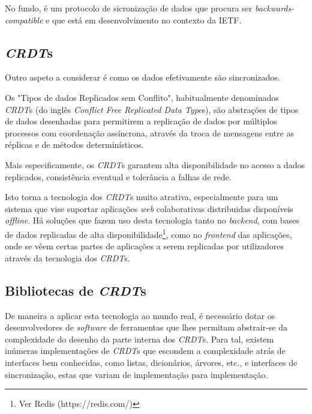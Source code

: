 \documentclass[runningheads]{llncs}
\begin{document}
        No fundo, é um protocolo de sicronização de dados que procura ser
        {\itshape backwards-compatible} e que está em desenvolvimento no
        contexto da IETF.

        \subsection{{\itshape CRDT}s}

        Outro aspeto a considerar é como os dados efetivamente são sincronizados.

        Os "Tipos de dados Replicados sem Conflito", habitualmente denominados
        {\itshape CRDT}s (do inglês {\itshape Conflict Free Replicated Data
        Type}s), são abstrações de tipos de dados desenhadas para permitirem a
        replicação de dados por múltiplos processos com coordenação assíncrona,
        através da troca de mensagens entre as réplicas e de métodos
        determinísticos\cite{CRDTs}.

        Mais especificamente, os {\itshape CRDT}s garantem alta disponibilidade
        no acesso a dados replicados, consistência eventual e tolerância a
        falhas de rede. 
        
        Isto torna a tecnologia dos {\itshape CRDT}s muito atrativa,
        especialmente para um sistema que vise suportar aplicações {\itshape
        web} colaborativas distribuidas disponíveis {\itshape offline}. Há soluções
        que fazem uso desta tecnologia tanto no {\itshape backend}, com bases de
        dados replicadas de alta disponibilidade\footnote{Ver Redis
        (https://redis.com/)}, como no {\itshape frontend} das aplicações, onde
        se vêem certas partes de aplicações a serem replicadas por utilizadores
        através da tecnologia dos {\itshape CRDT}s.

        \subsection{Bibliotecas de {\itshape CRDT}s}

        De maneira a aplicar esta tecnologia ao mundo real, é necessário dotar
        os desenvolvedores de {\itshape software} de ferramentas que lhes
        permitam abstrair-se da complexidade do desenho da parte interna dos
        {\itshape CRDT}s. Para tal, existem inúmeras implementações de {\itshape
        CRDT}s que escondem a complexidade atrás de interfaces bem conhecidas,
        como listas, dicionários, árvores, etc., e interfaces de sincronização,
        estas que variam de implementação para implementação.
\end{document}
